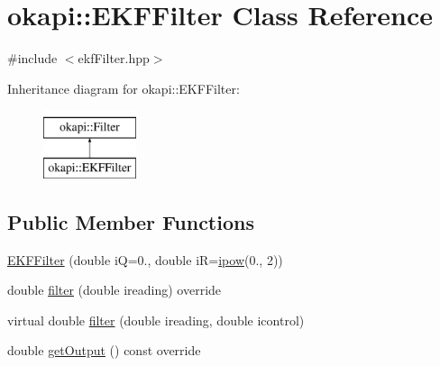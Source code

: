 \hypertarget{classokapi_1_1EKFFilter}{}\section{okapi\+::E\+K\+F\+Filter Class Reference}
\label{classokapi_1_1EKFFilter}


{\ttfamily \#include $<$ekf\+Filter.\+hpp$>$}

Inheritance diagram for okapi\+::E\+K\+F\+Filter\+:\begin{figure}[H]
\begin{center}
\leavevmode
\includegraphics[height=2.000000cm]{classokapi_1_1EKFFilter}
\end{center}
\end{figure}
\subsection*{Public Member Functions}
\begin{DoxyCompactItemize}
\item 
\mbox{\hyperlink{classokapi_1_1EKFFilter_a99716eac24dd8f87e04f746da9409089}{E\+K\+F\+Filter}} (double iQ=0., double iR=\mbox{\hyperlink{namespaceokapi_aba6bd8fdde45445ead2bd8c3bf887fb4}{ipow}}(0., 2))
\item 
double \mbox{\hyperlink{classokapi_1_1EKFFilter_a7deb4e14f154247b5521afa7603d09fd}{filter}} (double ireading) override
\item 
virtual double \mbox{\hyperlink{classokapi_1_1EKFFilter_a3999b84a0cf2cd2a4b5de20cfa7ed1f8}{filter}} (double ireading, double icontrol)
\item 
double \mbox{\hyperlink{classokapi_1_1EKFFilter_aaf3048eb6d68d248de7c59f84b0d1201}{get\+Output}} () const override
\end{DoxyCompactItemize}
